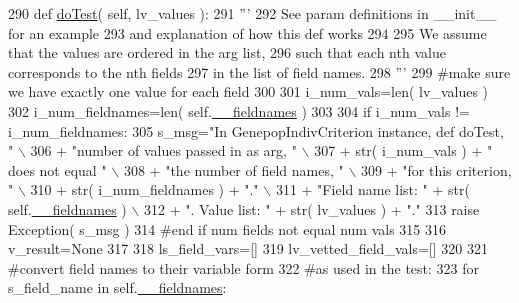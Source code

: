 \begin{DoxyCode}
290     \textcolor{keyword}{def }\hyperlink{classnegui_1_1genepopindividualid_1_1GenepopIndivCriterion_a7f540e7e62b1c078ed06bb42a07f34f6}{doTest}( self, lv\_values ):
291         \textcolor{stringliteral}{'''}
292 \textcolor{stringliteral}{        See param definitions in \_\_init\_\_ for an example}
293 \textcolor{stringliteral}{        and explanation of how this def works}
294 \textcolor{stringliteral}{}
295 \textcolor{stringliteral}{        We assume that the values are ordered in the arg list,}
296 \textcolor{stringliteral}{        such that each nth value corresponds to the nth fields}
297 \textcolor{stringliteral}{        in the list of field names.}
298 \textcolor{stringliteral}{        '''}
299         \textcolor{comment}{#make sure we have exactly one value for each field}
300 
301         i\_num\_vals=len( lv\_values )
302         i\_num\_fieldnames=len( self.\hyperlink{classnegui_1_1genepopindividualid_1_1GenepopIndivCriterion_a490a6d671b1933addb37c32af20248c2}{\_\_fieldnames} )
303 
304         \textcolor{keywordflow}{if} i\_num\_vals != i\_num\_fieldnames:
305             s\_msg=\textcolor{stringliteral}{"In GenepopIndivCriterion instance, def doTest, "} \(\backslash\)
306                         + \textcolor{stringliteral}{"number of values passed in as arg, "} \(\backslash\)
307                         + str( i\_num\_vals ) + \textcolor{stringliteral}{" does not equal "} \(\backslash\)
308                         + \textcolor{stringliteral}{"the number of field names, "} \(\backslash\)
309                         + \textcolor{stringliteral}{"for this criterion, "} \(\backslash\)
310                         + str( i\_num\_fieldnames ) + \textcolor{stringliteral}{"."} \(\backslash\)
311                         + \textcolor{stringliteral}{"Field name list: "} + str( self.\hyperlink{classnegui_1_1genepopindividualid_1_1GenepopIndivCriterion_a490a6d671b1933addb37c32af20248c2}{\_\_fieldnames} ) \(\backslash\)
312                         + \textcolor{stringliteral}{".  Value list: "} + str( lv\_values ) + \textcolor{stringliteral}{"."}
313             \textcolor{keywordflow}{raise} Exception( s\_msg )
314         \textcolor{comment}{#end if num fields not equal num vals}
315 
316         v\_result=\textcolor{keywordtype}{None}
317 
318         ls\_field\_vars=[]
319         lv\_vetted\_field\_vals=[]
320 
321         \textcolor{comment}{#convert field names to their variable form}
322         \textcolor{comment}{#as used in the test:}
323         \textcolor{keywordflow}{for} s\_field\_name \textcolor{keywordflow}{in} self.\hyperlink{classnegui_1_1genepopindividualid_1_1GenepopIndivCriterion_a490a6d671b1933addb37c32af20248c2}{\_\_fieldnames}:

\end{DoxyCode}
